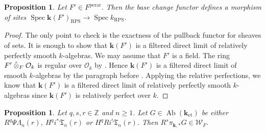 \documentclass{amsart}
\newtheorem{Prop}[Thm]{Proposition}
\theoremstyle{remark}
\numberwithin{equation}{section}
\newcommand{\Order}{\mathcal{O}}
\newcommand{\Z}{\mathbb{Z}}
\newcommand{\et}{\mathrm{et}}
\newcommand{\perar}{\mathrm{perar}}
\newcommand{\alg}[1]{\mathbf{#1}}
\newcommand{\ctensor}{\mathbin{\Hat{\otimes}}}
\newcommand{\RPS}{\mathrm{RPS}}
\DeclareMathOperator{\Spec}{Spec}
\DeclareMathOperator{\Ab}{Ab}
\begin{document}
\begin{Prop}
	Let $F' \in F^{\perar}$.
	Then the base change functor defines a morphism of sites
	$\Spec \alg{k}(F')_{\RPS} \to \Spec k_{\RPS}$.
\end{Prop}

\begin{proof}
	The only point to check is the exactness of the pullback functor
	for sheaves of sets.
	It is enough to show that $\alg{k}(F')$ is a filtered direct limit of
	relatively perfectly smooth $k$-algebras.
	We may assume that $F'$ is a field.
	The ring $F' \ctensor_{F} \Order_{k}$ is regular over $\Order_{k}$
	by \cite[Section 3.6, Lemma 2]{BLR90}.
	Hence $\alg{k}(F')$ is a filtered direct limit of smooth $k$-algebras
	by the paragraph before \cite[Section 3.6, Lemma 2]{BLR90}.
	Applying the relative perfections,
	we know that $\alg{k}(F')$ is a filtered direct limit of relatively perfectly smooth $k$-algebras
	since $\alg{k}(F')$ is relatively perfect over $k$.
\end{proof}

\begin{Prop} \label{0013}
	Let $q, s, r \in \Z$ and $n \ge 1$.
	Let $G \in \Ab(\alg{k}_{\et})$ be either $R^{q} \Psi \Lambda_{n}(r)$,
	$H^{q} i^{\ast} \mathfrak{T}_{n}(r)$ or
	$H^{q} R i^{!} \mathfrak{T}_{n}(r)$.
	Then $R^{s} \pi_{\alg{k}, \ast} G \in \mathcal{W}_{F}$.
\end{Prop}
\end{document}
